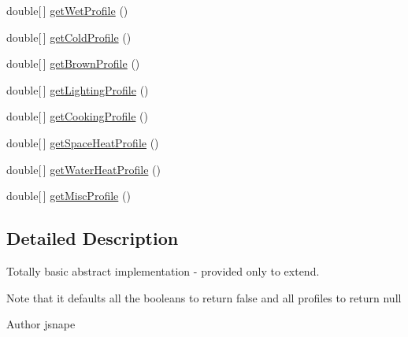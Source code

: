 \begin{DoxyCompactItemize}
double\mbox{[}$\,$\mbox{]} \hyperlink{classuk_1_1ac_1_1dmu_1_1iesd_1_1cascade_1_1util_1_1profilegenerators_1_1_basic_profile_generator_acdaea8931afd24a7cc895237366d830e}{get\-Wet\-Profile} ()
\item 
double\mbox{[}$\,$\mbox{]} \hyperlink{classuk_1_1ac_1_1dmu_1_1iesd_1_1cascade_1_1util_1_1profilegenerators_1_1_basic_profile_generator_a73d3f4c33e1c379281011f57bb5e7166}{get\-Cold\-Profile} ()
\item 
double\mbox{[}$\,$\mbox{]} \hyperlink{classuk_1_1ac_1_1dmu_1_1iesd_1_1cascade_1_1util_1_1profilegenerators_1_1_basic_profile_generator_a7304edd29f6c9677d1e89350c726f69f}{get\-Brown\-Profile} ()
\item 
double\mbox{[}$\,$\mbox{]} \hyperlink{classuk_1_1ac_1_1dmu_1_1iesd_1_1cascade_1_1util_1_1profilegenerators_1_1_basic_profile_generator_a1753ee50469d911de5b50e5452e360e5}{get\-Lighting\-Profile} ()
\item 
double\mbox{[}$\,$\mbox{]} \hyperlink{classuk_1_1ac_1_1dmu_1_1iesd_1_1cascade_1_1util_1_1profilegenerators_1_1_basic_profile_generator_a0901a14f0e636ae35c9e6ed72cdb9c57}{get\-Cooking\-Profile} ()
\item 
double\mbox{[}$\,$\mbox{]} \hyperlink{classuk_1_1ac_1_1dmu_1_1iesd_1_1cascade_1_1util_1_1profilegenerators_1_1_basic_profile_generator_ae2d6dc45eb54e1069c7d851f5237cee3}{get\-Space\-Heat\-Profile} ()
\item 
double\mbox{[}$\,$\mbox{]} \hyperlink{classuk_1_1ac_1_1dmu_1_1iesd_1_1cascade_1_1util_1_1profilegenerators_1_1_basic_profile_generator_abdb697cbf2cdf0940689a7f8eb6cebda}{get\-Water\-Heat\-Profile} ()
\item 
double\mbox{[}$\,$\mbox{]} \hyperlink{classuk_1_1ac_1_1dmu_1_1iesd_1_1cascade_1_1util_1_1profilegenerators_1_1_basic_profile_generator_a9995b6ccb854ea28cd24bc7b98402a01}{get\-Misc\-Profile} ()
\end{DoxyCompactItemize}


\subsection{Detailed Description}
Totally basic abstract implementation -\/ provided only to extend. 

Note that it defaults all the booleans to return false and all profiles to return null

\begin{DoxyAuthor}{Author}
jsnape 
\end{DoxyAuthor}


